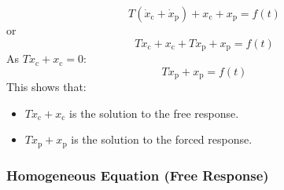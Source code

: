 \documentclass[12pt,letter]{article}
\begin{document}
\begin{equation}
T(\dot{x}_\text{c} + \dot{x}_\text{p}) + x_\text{c}+x_\text{p} = f(t)
\end{equation}
or
\begin{equation}
T\dot{x}_\text{c} + x_\text{c} + T \dot{x}_\text{p} + x_\text{p} = f(t)
\end{equation}
As $T\dot{x}_\text{c} + x_\text{c}=0$:
\begin{equation}
T \dot{x}_\text{p} + x_\text{p} = f(t)
\end{equation}
This shows that:
\begin{itemize}
\item $T\dot{x}_\text{c} + x_\text{c}$ is the solution to the free response.
\item $T \dot{x}_\text{p} + x_\text{p}$ is the solution to the forced response.
\end{itemize}

\subsubsection{Homogeneous Equation (Free Response)}
\end{document}
